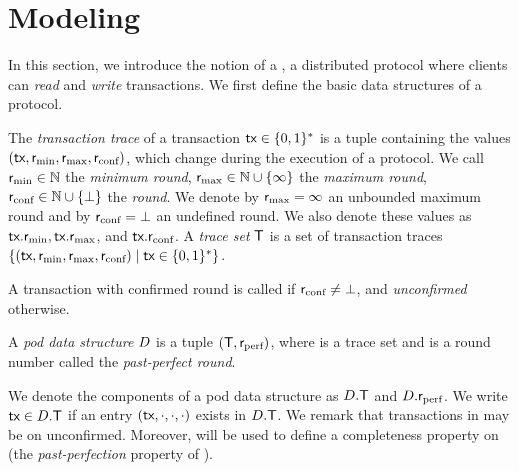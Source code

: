 \section{Modeling \podtm} \label{sec:pod-model}
In this section, we introduce the notion of a \podtm, a distributed protocol where clients can \emph{read} and \emph{write} transactions.
We first define the basic data structures of a \podtm protocol.

\begin{definition}
    The \emph{transaction trace} of a transaction $\textsf{tx} \in \{ 0, 1\}^*$ is a tuple containing the values $(\textsf{tx}, \textsf{r}_\text{min}, \textsf{r}_\text{max}, \textsf{r}_\text{conf})$, which change during the execution of a \podtm protocol.
    We call $\textsf{r}_\text{min} \in \mathbb{N}$ the \emph{minimum round}, $\textsf{r}_\text{max} \in \mathbb{N} \cup \{\infty\}$ the \emph{maximum round},
    $\textsf{r}_\text{conf} \in \mathbb{N} \cup \{\bot\}$ the \emph{\confirmed round}.
    We denote by $\textsf{r}_\text{max}=\infty$ an unbounded maximum round and by $\textsf{r}_\text{conf}=\bot$ an undefined \confirmed round.
    We also denote these values as $\textsf{tx}.\textsf{r}_\text{min}, \textsf{tx}.\textsf{r}_\text{max}$, and $\textsf{tx}.\textsf{r}_\text{conf}$.
    A \emph{trace set} $\textsf{T}$ is a set of transaction traces $\{(\textsf{tx}, \textsf{r}_\text{min}, \textsf{r}_\text{max}, \textsf{r}_\text{conf}) \mid \textsf{tx} \in \{ 0, 1\}^*\}$.
\end{definition}

\begin{definition}
    A transaction with confirmed round \rconf is called \emph{\confirmed} if $\textsf{r}_\text{conf} \neq \bot$, and \emph{unconfirmed} otherwise.
\end{definition}



\begin{definition}
    A \emph{pod data structure} $D$ is a tuple $(\textsf{T}, \textsf{r}_\text{perf})$, where \txSet is a trace set and \rperf is a round number called the \emph{past-perfect round}.
\end{definition}
We denote the components of a pod data structure as $D.\textsf{T}$ and $D.\textsf{r}_\text{perf}$.
We write $\textsf{tx} \in D.\textsf{T}$ if an entry $(\textsf{tx}, \cdot, \cdot, \cdot)$ exists in $D.\textsf{T}$.
We remark that transactions in \txSet may be \confirmed on unconfirmed. Moreover, \rperf will be used to define a completeness property on \txSet (the \emph{past-perfection} property of \podtm).


